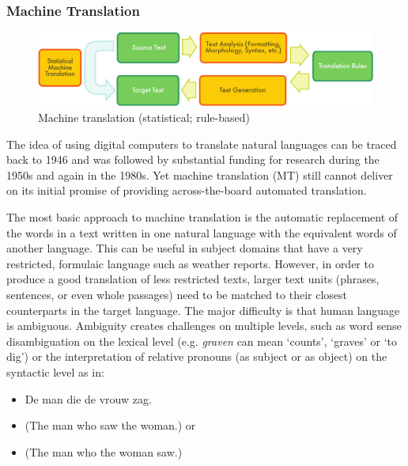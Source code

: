 \documentclass[]{../../metanetpaper}
\begin{document}
\begin{multicols}{2}
\subsubsection{Machine Translation}

\begin{figure}[htb]
  \center
  \includegraphics[width=\textwidth]{../_media/english/machine_translation}
  \caption{Machine translation (statistical; rule-based)}
  \label{fig:mtarch_en}
\end{figure}

The idea of using digital computers to translate natural languages can be traced back to 1946 and was followed by substantial funding for research during the 1950s and again in the 1980s.
Yet machine translation (MT) still cannot deliver on its initial promise of providing across-the-board automated translation.


The most basic approach to machine translation is the automatic replacement of the words in a text written in one natural language with the equivalent words of another language. This can be useful in subject domains that have a very restricted, formulaic language such as weather reports.
However, in order to produce a good translation of less restricted texts, larger text units (phrases, sentences, or even whole passages) need to be matched to their closest counterparts in the target language. The major difficulty is that human language is ambiguous. Ambiguity creates challenges on multiple levels, such as word sense disambiguation on the lexical level (e.g. \textit{graven} can mean `counts',  `graves' or `to dig')  or the interpretation of relative pronouns (as subject or as object) on the syntactic level as in:

\begin{itemize}
\item De man die de vrouw zag.
\item (The man who saw the woman.) or 
\item (The man who the woman saw.)
\end{itemize}


\end{multicols}
\end{document}
